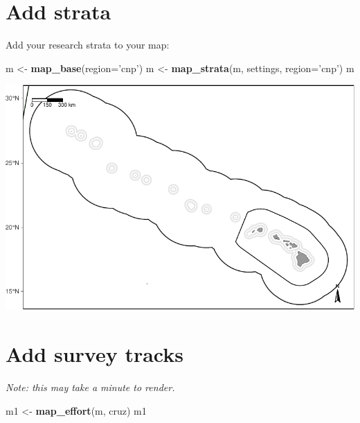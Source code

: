 \documentclass[
]{book}
\newenvironment{Shaded}{\begin{snugshade}}{\end{snugshade}}
\newcommand{\DataTypeTok}[1]{\textcolor[rgb]{0.13,0.29,0.53}{#1}}
\newcommand{\KeywordTok}[1]{\textcolor[rgb]{0.13,0.29,0.53}{\textbf{#1}}}
\newcommand{\NormalTok}[1]{#1}
\newcommand{\StringTok}[1]{\textcolor[rgb]{0.31,0.60,0.02}{#1}}
\begin{document}
\hypertarget{add-strata}{%
\section*{Add strata}\label{add-strata}}

Add your research strata to your map:

\begin{Shaded}
\begin{Highlighting}[]
\NormalTok{m <-}\StringTok{ }\KeywordTok{map_base}\NormalTok{(}\DataTypeTok{region=}\StringTok{'cnp'}\NormalTok{)}
\NormalTok{m <-}\StringTok{ }\KeywordTok{map_strata}\NormalTok{(m, }
\NormalTok{                settings, }
                \DataTypeTok{region=}\StringTok{'cnp'}\NormalTok{)}
\NormalTok{m}
\end{Highlighting}
\end{Shaded}

\includegraphics{figures/unnamed-chunk-46-1.pdf}

\hypertarget{add-survey-tracks}{%
\section*{Add survey tracks}\label{add-survey-tracks}}

\emph{Note: this may take a minute to render.}

\begin{Shaded}
\begin{Highlighting}[]
\NormalTok{m1 <-}\StringTok{ }\KeywordTok{map_effort}\NormalTok{(m, cruz)}
\NormalTok{m1}
\end{Highlighting}
\end{Shaded}
\end{document}
